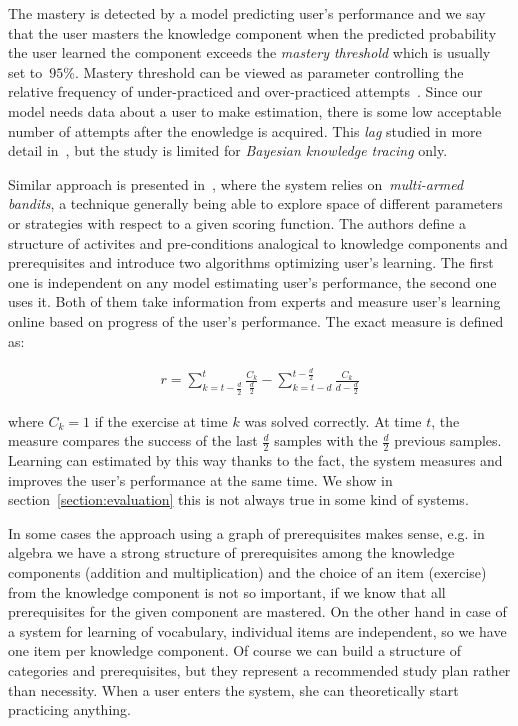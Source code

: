 \documentclass[table,color]{fithesis3/fithesis3}
\begin{document}
The mastery is detected by a model predicting user's performance and we say
that the user masters the knowledge component when the predicted probability
the user learned the component exceeds the \emph{mastery threshold} which is
usually set to~$95\%$. Mastery threshold can be viewed as parameter controlling
the relative frequency of under-practiced and over-practiced
attempts~\cite{fancsali2013optimal}. Since our model needs data about a user
to make estimation, there is some low acceptable number of attempts after the
enowledge is acquired. This \emph{lag} studied in more detail
in~\cite{fancsali2013optimal}, but the study is limited for \emph{Bayesian
knowledge tracing} only.

Similar approach is presented in~\cite{lopes2015multi}, where the system relies
on~\emph{multi-armed bandits}, a technique generally being able to explore
space of different parameters or strategies with respect to a given scoring
function. The authors define a structure of activites and pre-conditions
analogical to knowledge components and prerequisites and introduce two
algorithms optimizing user's learning. The first one is independent on any
model estimating user's performance, the second one uses it. Both of them take
information from experts and measure user's learning online based on progress
of the user's performance. The exact measure is defined as:

\begin{align}
	r = \sum^{t}_{k = t - \frac{d}{2}} \frac{C_k}{\frac{d}{2}} - \sum^{t - \frac{d}{2}}_{k = t - d} \frac{C_k}{d - \frac{d}{2}}
\end{align}

where $C_k = 1$ if the exercise at time $k$ was solved correctly. At time $t$,
the measure compares the success of the last $\frac{d}{2}$ samples with the
$\frac{d}{2}$ previous samples. Learning can estimated by this way thanks to
the fact, the system measures and improves the user's performance at the same
time. We show in section~\ref{section:evaluation} this is not always true in
some kind of systems.

In some cases the approach using a graph of prerequisites makes sense, e.g.
in algebra we have a strong structure of prerequisites among the knowledge
components (addition and multiplication) and the choice of an item (exercise)
from the knowledge component is not so important, if we know that all
prerequisites for the given component are mastered. On the other hand in case
of a system for learning of vocabulary, individual items are independent, so we
have one item per knowledge component. Of course we can build a structure of
categories and prerequisites, but they represent a recommended study plan
rather than necessity. When a user enters the system, she can theoretically
start practicing anything.
\end{document}
